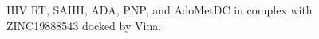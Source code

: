 \begin{figure}
{  \label{subfig:3BGS-ZINC19888543}
}
\caption{HIV RT, SAHH, ADA, PNP, and AdoMetDC in complex with ZINC19888543 docked by Vina.}
\label{fig:Vina-ZINC19888543}
\end{figure}


